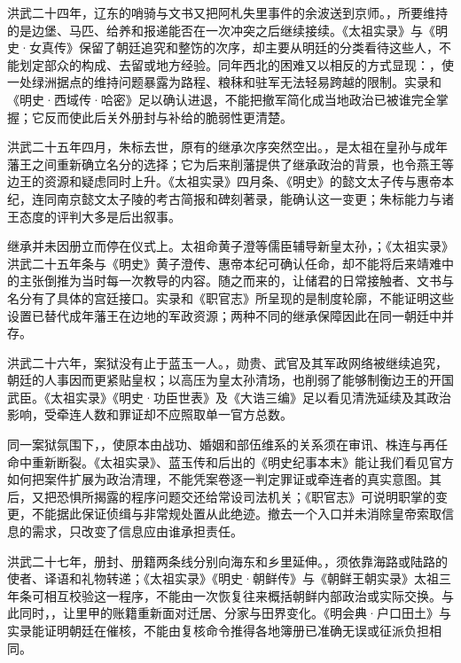洪武二十四年，辽东的哨骑与文书又把阿札失里事件的余波送到京师。，所要维持的是边堡、马匹、给养和报递能否在一次冲突之后继续接续。《太祖实录》与《明史·女真传》保留了朝廷追究和整饬的次序，却主要从明廷的分类看待这些人，不能划定部众的构成、去留或地方经验。同年西北的困难又以相反的方式显现：，使一处绿洲据点的维持问题暴露为路程、粮秣和驻军无法轻易跨越的限制。实录和《明史·西域传·哈密》足以确认进退，不能把撤军简化成当地政治已被谁完全掌握；它反而使此后关外册封与补给的脆弱性更清楚。

洪武二十五年四月，朱标去世，原有的继承次序突然空出。，是太祖在皇孙与成年藩王之间重新确立名分的选择；它为后来削藩提供了继承政治的背景，也令燕王等边王的资源和疑虑同时上升。《太祖实录》四月条、《明史》的懿文太子传与惠帝本纪，连同南京懿文太子陵的考古简报和碑刻著录，能确认这一变更；朱标能力与诸王态度的评判大多是后出叙事。

继承并未因册立而停在仪式上。太祖命黄子澄等儒臣辅导新皇太孙，；《太祖实录》洪武二十五年条与《明史》黄子澄传、惠帝本纪可确认任命，却不能将后来靖难中的主张倒推为当时每一次教导的内容。随之而来的，让储君的日常接触者、文书与名分有了具体的宫廷接口。实录和《职官志》所呈现的是制度轮廓，不能证明这些设置已替代成年藩王在边地的军政资源；两种不同的继承保障因此在同一朝廷中并存。

洪武二十六年，案狱没有止于蓝玉一人。，勋贵、武官及其军政网络被继续追究，朝廷的人事因而更紧贴皇权；以高压为皇太孙清场，也削弱了能够制衡边王的开国武臣。《太祖实录》《明史·功臣世表》及《大诰三编》足以看见清洗延续及其政治影响，受牵连人数和罪证却不应照取单一官方总数。

同一案狱氛围下，，使原本由战功、婚姻和部伍维系的关系须在审讯、株连与再任命中重新断裂。《太祖实录》、蓝玉传和后出的《明史纪事本末》能让我们看见官方如何把案件扩展为政治清理，不能凭案卷逐一判定罪证或牵连者的真实意图。其后，又把恐惧所揭露的程序问题交还给常设司法机关；《职官志》可说明职掌的变更，不能据此保证侦缉与非常规处置从此绝迹。撤去一个入口并未消除皇帝索取信息的需求，只改变了信息应由谁承担责任。

洪武二十七年，册封、册籍两条线分别向海东和乡里延伸。，须依靠海路或陆路的使者、译语和礼物转递；《太祖实录》《明史·朝鲜传》与《朝鲜王朝实录》太祖三年条可相互校验这一程序，不能由一次恢复往来概括朝鲜内部政治或实际交换。与此同时，，让里甲的账籍重新面对迁居、分家与田界变化。《明会典·户口田土》与实录能证明朝廷在催核，不能由复核命令推得各地簿册已准确无误或征派负担相同。

